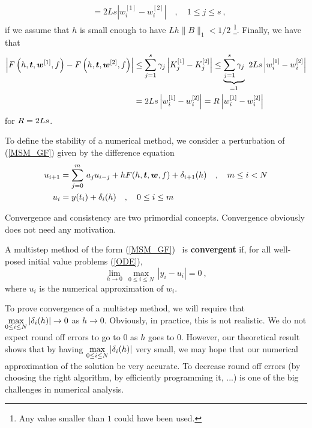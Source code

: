 \begin{enumerate}
\begin{align*}
&= 2 L s \left| w_i^{[1]} - w_i^{[2]} \right|
\quad , \quad 1 \leq j \leq s \ ,
\end{align*}
if we assume that $h$ is small enough to have $L h\|B\|_1 < 1/2$
\footnote{Any value smaller than $1$ could have been used.}.
Finally, we have that
\begin{align*}
\left| F\left(h,\bm{t},\bm{w}^{[1]},f\right)
- F\left(h,\bm{t},\bm{w}^{[2]},f\right) \right|
&\leq \sum_{j=1}^s \gamma_j \left| K_j^{[1]} - K_j^{[2]}\right|
\leq \underbrace{\sum_{j=1}^s \gamma_j}_{=1}
\ 2 L s \left| w_i^{[1]} - w_i^{[2]} \right| \\
&= 2 L s \left| w_i^{[1]} - w_i^{[2]} \right|
= R \left| w_i^{[1]} - w_i^{[2]} \right|
\end{align*}
for $\displaystyle R = 2 L s$.
\end{enumerate}

To define the stability of a numerical method, we consider a perturbation
of (\ref{MSM_GF}) given by the difference equation
\begin{equation} \label{MSM_GFpertub}
\begin{split}
u_{i+1} &= \sum_{j=0}^m\,a_ju_{i-j} + h F(h,\bm{t},\bm{w},f)
+ \delta_{i+1}(h) \quad, \quad m\leq i < N \\
u_i &= y(t_i) + \delta_i(h) \quad, \quad 0 \leq i \leq m
\end{split}
\end{equation}

Convergence and consistency are two primordial concepts.  Convergence
obviously does not need any motivation. 

\begin{defn}
A multistep method of the form (\ref{MSM_GF}) \footnotemark\ is
{\bfseries convergent} if,
for all well-posed initial value problems (\ref{ODE}),
\[
\lim_{h \rightarrow 0}\,\max_{0\leq i \leq N} \,|y_i - u_i| = 0 \ ,
\]
where $u_i$ is the numerical approximation of $w_i$.
\label{methodConv}
\end{defn}


\begin{rmk}
To prove convergence of a multistep method, we will require that
$\displaystyle \max_{0\leq i \leq N} |\delta_i(h)| \to 0$ as $h\to 0$.
Obviously, in practice, this is not realistic.  We do not expect
round off errors to go to $0$ as $h$ goes to $0$.  However, our
theoretical result shows that by having 
$\displaystyle \max_{0\leq i \leq N} |\delta_i(h)|$ very small,
we may hope that our numerical approximation of the solution be
very accurate.  To decrease round off errors (by choosing
the right algorithm, by efficiently programming it, ...) is one of
the big challenges in numerical analysis.
\end{rmk}

